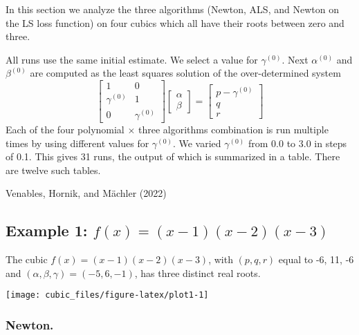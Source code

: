 \documentclass[
  12pt,
]{article}
\begin{document}
In this section we analyze the three algorithms (Newton, ALS, and Newton on the LS loss function) on
four cubics which all have their roots between zero and three.

All runs use the same initial estimate. We select a value for \(\gamma^{(0)}\). Next \(\alpha^{(0)}\) and \(\beta^{(0)}\) are computed as the least squares solution of the over-determined system
\begin{equation}
\begin{bmatrix}
1&0\\
\gamma^{(0)}&1\\
0&\gamma^{(0)}
\end{bmatrix}
\begin{bmatrix}\alpha\\\beta\end{bmatrix}
=\begin{bmatrix}p-\gamma^{(0)}\\q\\r\end{bmatrix}
\end{equation}
Each of the four polynomial \(\times\) three algorithms combination is run multiple times by using different values
for \(\gamma^{(0)}\). We varied \(\gamma^{(0)}\) from 0.0 to 3.0 in steps of 0.1. This gives 31 runs, the output of which is summarized in a table. There are twelve such tables.

Venables, Hornik, and Mächler (2022)

\subsection{\texorpdfstring{Example 1: \(f(x)=(x-1)(x-2)(x-3)\)}{Example 1: f(x)=(x-1)(x-2)(x-3)}}\label{example-1-fxx-1x-2x-3}

\footnotesize

\normalsize
The cubic \(f(x)=(x-1)(x-2)(x-3)\), with \((p,q,r)\) equal to -6, 11, -6
and \((\alpha,\beta,\gamma)=(-5, 6, -1)\), has
three distinct real roots.

\footnotesize

\begin{center}\texttt{[image: cubic\_files/figure-latex/plot1-1]} \end{center}

\normalsize

\footnotesize

\normalsize

\subsubsection{Newton.}\label{newton.}
\end{document}
